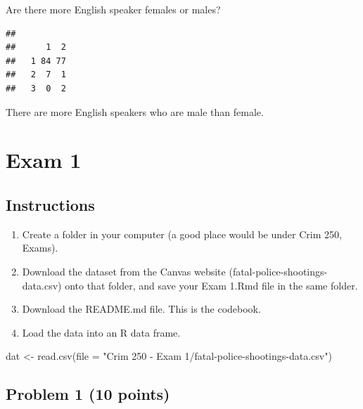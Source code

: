 \documentclass[
]{article}
\newenvironment{Shaded}{\begin{snugshade}}{\end{snugshade}}
\newcommand{\AttributeTok}[1]{\textcolor[rgb]{0.77,0.63,0.00}{#1}}
\newcommand{\FunctionTok}[1]{\textcolor[rgb]{0.00,0.00,0.00}{#1}}
\newcommand{\NormalTok}[1]{#1}
\newcommand{\OtherTok}[1]{\textcolor[rgb]{0.56,0.35,0.01}{#1}}
\newcommand{\SpecialCharTok}[1]{\textcolor[rgb]{0.00,0.00,0.00}{#1}}
\newcommand{\StringTok}[1]{\textcolor[rgb]{0.31,0.60,0.02}{#1}}
\begin{document}
Are there more English speaker females or males?

\begin{Shaded}
\end{Shaded}

\begin{verbatim}
##    
##      1  2
##   1 84 77
##   2  7  1
##   3  0  2
\end{verbatim}

There are more English speakers who are male than female.

\hypertarget{exam-1}{%
\section{Exam 1}\label{exam-1}}

\hypertarget{instructions}{%
\subsection{Instructions}\label{instructions}}

\begin{enumerate}
\def\labelenumi{\alph{enumi}.}
\item
  Create a folder in your computer (a good place would be under Crim
  250, Exams).
\item
  Download the dataset from the Canvas website
  (fatal-police-shootings-data.csv) onto that folder, and save your Exam
  1.Rmd file in the same folder.
\item
  Download the README.md file. This is the codebook.
\item
  Load the data into an R data frame.
\end{enumerate}

\begin{Shaded}
\begin{Highlighting}[]
\NormalTok{dat }\OtherTok{\textless{}{-}} \FunctionTok{read.csv}\NormalTok{(}\AttributeTok{file =} \StringTok{"Crim 250 {-} Exam 1/fatal{-}police{-}shootings{-}data.csv"}\NormalTok{)}
\end{Highlighting}
\end{Shaded}

\hypertarget{problem-1-10-points}{%
\subsection{Problem 1 (10 points)}\label{problem-1-10-points}}
\end{document}
